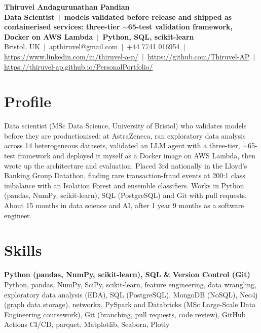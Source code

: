 \documentclass[a4paper,11pt]{article}
\begin{document}
\begin{center}
    {\LARGE\bf Thiruvel Andagurunathan Pandian} \\[3pt]
    {\color{headernavy}\small\textbf{Data Scientist \,$|$\, models validated before release and shipped as containerised services: three-tier $\sim$65-test validation framework, Docker on AWS Lambda \,$|$\, Python, SQL, scikit-learn}} \\[3pt]
    Bristol, UK
    \,$|$\,
    \href{mailto:apthiruvel@gmail.com}{apthiruvel@gmail.com} \,$|$\,
    \href{tel:+447741016954}{+44 7741 016954} \,$|$\,
    \href{https://www.linkedin.com/in/thiruvel-a-p/}{https://www.linkedin.com/in/thiruvel-a-p/} \,$|$\,
    \href{https://github.com/Thiruvel-AP}{https://github.com/Thiruvel-AP} \,$|$\, \href{https://thiruvel-ap.github.io/PersonalPortfolio/}{https://thiruvel-ap.github.io/PersonalPortfolio/}

\vspace{4pt}
\end{center}

\section{Profile}
\vspace{3pt}
\noindent Data scientist (MSc Data Science, University of Bristol) who validates models before they are productionised: at AstraZeneca, ran exploratory data analysis across 14 heterogeneous datasets, validated an LLM agent with a three-tier, $\sim$65-test framework and deployed it myself as a Docker image on AWS Lambda, then wrote up the architecture and evaluation. Placed 3rd nationally in the Lloyd's Banking Group Datathon, finding rare transaction-fraud events at 200:1 class imbalance with an Isolation Forest and ensemble classifiers. Works in Python (pandas, NumPy, scikit-learn), SQL (PostgreSQL) and Git with pull requests. About 15 months in data science and AI, after 1 year 9 months as a software engineer.

\section{Skills}
\vspace{2pt}

\noindent \textbf{Python (pandas, NumPy, scikit-learn), SQL \& Version Control (Git)}
    \\
    Python, pandas, NumPy, SciPy, scikit-learn, feature engineering, data wrangling, exploratory data analysis (EDA), SQL (PostgreSQL), MongoDB (NoSQL), Neo4j (graph data storage), networkx, PySpark and Databricks (MSc Large-Scale Data Engineering coursework), Git (branching, pull requests, code review), GitHub Actions CI/CD, parquet, Matplotlib, Seaborn, Plotly
\end{document}
